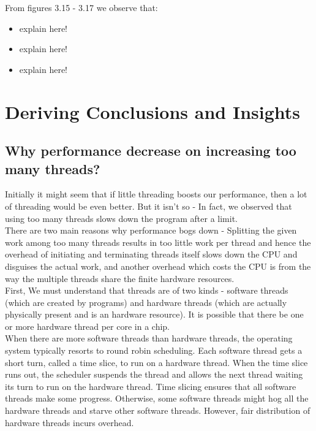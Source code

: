 \documentclass[paper=a4, fontsize = 12pt]{scrartcl}
\numberwithin{equation}{section}		%
\numberwithin{figure}{section}			%
\numberwithin{table}{section}				%
\begin{document}
From figures 3.15 - 3.17 we observe that: 
\begin{itemize}
    \item explain here!
    
    \item explain here!
    
    \item explain here!
\end{itemize}


\section{Deriving Conclusions and Insights}

\subsection{Why performance decrease on increasing too many threads?}

Initially it might seem that if little threading boosts our performance, then a lot of threading would be even better. But it isn't so - In fact, we observed that using too many threads slows down the program after a limit. \\

There are two main reasons why performance bogs down - Splitting the given work among too many threads results in too little work per thread and hence the overhead of initiating and terminating threads itself slows down the CPU and disguises the actual work, and another overhead which costs the CPU is from the way the multiple threads share the finite hardware resources.\\

First, We must understand that threads are of two kinds - software threads (which are created by programs) and hardware threads (which are actually physically present and is an hardware resource). It is possible that there be one or more hardware thread per core in a chip.\\

When there are more software threads than hardware threads, the operating system typically resorts to round robin scheduling. Each software thread gets a short turn, called a time slice, to run on a hardware thread. When the time slice runs out, the scheduler suspends the thread and allows the next thread waiting its turn to run on the hardware thread. Time slicing ensures that all software threads make some progress. Otherwise, some software threads might hog all the hardware threads and starve other software threads. However, fair distribution of hardware threads incurs overhead. \\
\end{document}

